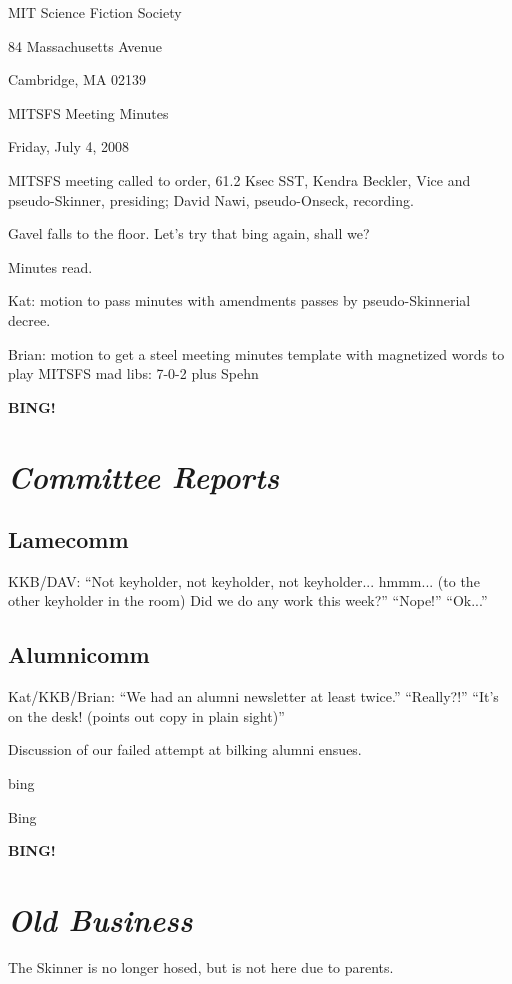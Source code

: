 \documentclass[10pt]{article}
\newcommand{\bing}{{\bf BING!} }
\newcommand{\goto}[1]{\bing \vskip 12pt \section*{{\em{#1}}}}
\newcommand{\ps}{ plus Spehn\xspace}
\begin{document}
\begin{center}

MIT Science Fiction Society

84 Massachusetts Avenue

Cambridge, MA 02139

\vspace{12pt}

MITSFS Meeting Minutes

Friday, July 4, 2008

\end{center}

\vspace{18pt}

\setlength{\parskip}{6pt}

\noindent
MITSFS meeting called to order, 61.2 Ksec SST,
Kendra Beckler, Vice and pseudo-Skinner, presiding; David Nawi, pseudo-Onseck, recording.

Gavel falls to the floor.  Let's try that bing again, shall we?

Minutes read.

Kat: motion to pass minutes with amendments passes by pseudo-Skinnerial decree.

Brian: motion to get a steel meeting minutes template with magnetized words to play MITSFS mad libs: 7-0-2 \ps

\BING

\goto{Committee Reports}


\subsection*{Lamecomm}
KKB/DAV: ``Not keyholder, not keyholder, not keyholder... hmmm... (to the other keyholder in the room)  Did we do any work this week?''  ``Nope!''  ``Ok...''

\subsection*{Alumnicomm}
Kat/KKB/Brian: ``We had an alumni newsletter at least twice.''  ``Really?!''  ``It's on the desk!  (points out copy in plain sight)''

Discussion of our failed attempt at bilking alumni ensues.

bing

Bing

\goto{Old Business}

The Skinner is no longer hosed, but is not here due to parents.
\end{document}
